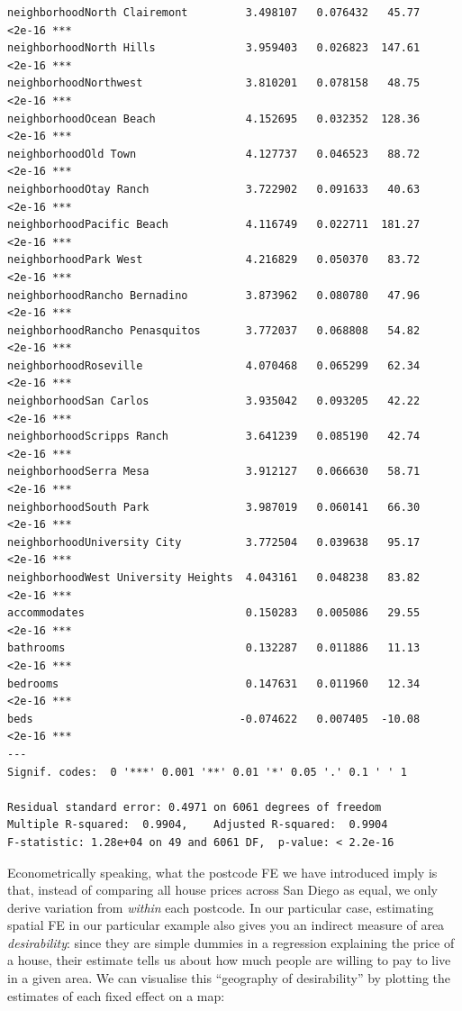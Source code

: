 \documentclass[
  letterpaper,
  DIV=11,
  numbers=noendperiod,
  oneside]{scrreprt}
\begin{document}
\begin{verbatim}
neighborhoodNorth Clairemont         3.498107   0.076432   45.77   <2e-16 ***
neighborhoodNorth Hills              3.959403   0.026823  147.61   <2e-16 ***
neighborhoodNorthwest                3.810201   0.078158   48.75   <2e-16 ***
neighborhoodOcean Beach              4.152695   0.032352  128.36   <2e-16 ***
neighborhoodOld Town                 4.127737   0.046523   88.72   <2e-16 ***
neighborhoodOtay Ranch               3.722902   0.091633   40.63   <2e-16 ***
neighborhoodPacific Beach            4.116749   0.022711  181.27   <2e-16 ***
neighborhoodPark West                4.216829   0.050370   83.72   <2e-16 ***
neighborhoodRancho Bernadino         3.873962   0.080780   47.96   <2e-16 ***
neighborhoodRancho Penasquitos       3.772037   0.068808   54.82   <2e-16 ***
neighborhoodRoseville                4.070468   0.065299   62.34   <2e-16 ***
neighborhoodSan Carlos               3.935042   0.093205   42.22   <2e-16 ***
neighborhoodScripps Ranch            3.641239   0.085190   42.74   <2e-16 ***
neighborhoodSerra Mesa               3.912127   0.066630   58.71   <2e-16 ***
neighborhoodSouth Park               3.987019   0.060141   66.30   <2e-16 ***
neighborhoodUniversity City          3.772504   0.039638   95.17   <2e-16 ***
neighborhoodWest University Heights  4.043161   0.048238   83.82   <2e-16 ***
accommodates                         0.150283   0.005086   29.55   <2e-16 ***
bathrooms                            0.132287   0.011886   11.13   <2e-16 ***
bedrooms                             0.147631   0.011960   12.34   <2e-16 ***
beds                                -0.074622   0.007405  -10.08   <2e-16 ***
---
Signif. codes:  0 '***' 0.001 '**' 0.01 '*' 0.05 '.' 0.1 ' ' 1

Residual standard error: 0.4971 on 6061 degrees of freedom
Multiple R-squared:  0.9904,    Adjusted R-squared:  0.9904 
F-statistic: 1.28e+04 on 49 and 6061 DF,  p-value: < 2.2e-16
\end{verbatim}

Econometrically speaking, what the postcode FE we have introduced imply
is that, instead of comparing all house prices across San Diego as
equal, we only derive variation from \emph{within} each postcode. In our
particular case, estimating spatial FE in our particular example also
gives you an indirect measure of area \emph{desirability}: since they
are simple dummies in a regression explaining the price of a house,
their estimate tells us about how much people are willing to pay to live
in a given area. We can visualise this ``geography of desirability'' by
plotting the estimates of each fixed effect on a map:
\end{document}

